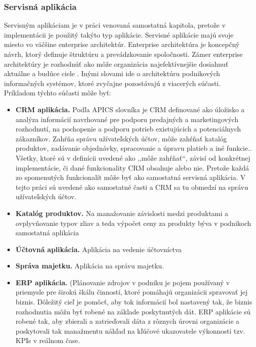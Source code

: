 \subsubsection{Servisná aplikácia}
Servisným aplikáciam je v práci venovaná samostatná kapitola, pretože v implementácii je použitý takýto typ aplikácie. Servisné aplikácie majú svoje miesto vo väčšine enterprise architektúr.  Enterprise architektúra je koncepčný návrh, ktorý definuje štruktúru a prevádzkovanie spoločnosti. Zámer enterprise architektúry je rozhodnúť ako môže organizácia najefektívnejšie dosiahnuť aktuálne a budúce ciele \cite{IOT09}. Inými slovami ide o  architektúru podnikových informačných systémov, ktoré zvyčajne pozostávajú z viacerých súčasti. Príkladom týchto súčasti môže byť:
\begin{itemize}
  \item  \textbf{CRM aplikácia.} Podľa APICS slovníka \cite{IOT10} je CRM definované ako úložisko a analýza informácií navrhované pre podporu predajných a marketingových rozhodnutí, na pochopenie a podporu potrieb existujúcich a potenciálnych zákazníkov. Zahŕňa správu užívateľských účtov, môže zahŕňať katalóg produktov, zadávanie objednávky, spracovanie a úpravu platieb a iné funkcie.\cite{IOT11}. Všetky, ktoré sú v definícii uvedené ako ,,môže zahŕňať``, závisí od konkrétnej implementácie, či dané funkcionality CRM obsahuje alebo nie. Pretože každá zo spomenutých funkcionalít môže byť ako samostatná servisná aplikácia. V tejto práci sú uvedené ako samostatné časti a CRM sa tu obmedzí na správu užívateľských účtov.
  \item  \textbf{Katalóg produktov.} Na manažovanie závislosti medzi produktami a ovplyvňovanie typov zliav a teda výpočet ceny za produkty býva v podnikoch samostatná aplikácia
 \item  \textbf{Účtovná aplikácia.} Aplikácia na vedenie účtovníctva
 \item  \textbf{Správa majetku.} Aplikácia na správu majetku. 
  \item  \textbf{ERP aplikácia.} (Plánovanie zdrojov v podniku je pojem používaný v priemysle pre širokú škálu činností, ktoré pomáhajú organizácii spravovať jej biznis. Dôležitý cieľ je pomôcť, aby tok informácií bol nastavený tak, že biznis rozhodnutia môžu byť robené na základe poskytnutých dát. ERP aplikácie sú robené tak, aby zbierali a zatrieďovali dáta z rôznych úrovni organizácie a poskytovali tak manažmentu náhľad na kľúčové ukazovatele výkonnosti tzv. KPIs v reálnom čase.\cite{IOT12} 
\end{itemize} 
